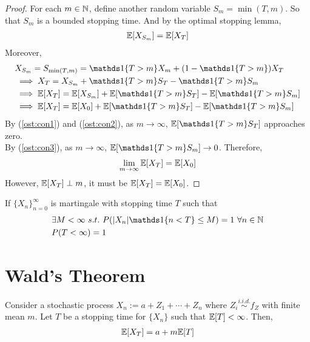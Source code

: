 \documentclass{article}
\begin{document}
	\begin{proof}
		For each $m \in \mathbb{N}$, define another random variable $S_m = \min(T, m)$. So that $S_m$ is a bounded stopping time. And by the optimal stopping lemma,
		\begin{align}
			\mathbb{E}[{X_{S_m}}] = \mathbb{E}[{X_T}]
		\end{align}
		Moreover,
		\begin{align}
			&X_{S_m} = S_{\min(T,m)} = \id{T > m} X_m + (1 - \id{T > m}) X_T \\
			&\implies X_T = X_{S_m} + \id{T > m} S_T - \id{T > m} S_m \\
			&\implies \expect{X_T} = \expect{X_{S_m}} + \expect{\id{T > m} S_T} - \expect{\id{T > m} S_m} \\
			&\implies \expect{X_T} = \expect{X_0} + \expect{\id{T > m} S_T} - \expect{\id{T > m} S_m}
		\end{align}
		By (\ref{ost:con1}) and (\ref{ost:con2}), as $m \to \infty$, $\expect{\id{T > m} S_T}$ approaches zero. \\
		By (\ref{ost:con3}), as $m \to \infty$, $\expect{\id{T > m} S_m} \to 0$. Therefore,
		\begin{align}
			\lim_{m \to \infty} \mathbb{E}[{X_T}] = \mathbb{E}[{X_0}]
		\end{align}
		However, $\mathbb{E}[{X_T}] \perp m$, it must be $\mathbb{E}[{X_T}] = \mathbb{E}[{X_0}]$.
	\end{proof}
	
	\begin{corollary}
		If $\{X_n\}_{n=0}^\infty$ is martingale with stopping time $T$ such that
		\begin{align}
			&\exists M < \infty\ s.t.\ P(|X_n|\id{n < T} \leq M) = 1\ \forall n \in \N \\
			&P(T < \infty) = 1
		\end{align}
	\end{corollary}
	
	\section{Wald's Theorem}
	\begin{theorem}
		Consider a stochastic process $X_n := a + Z_1 + \cdots + Z_n$ where $Z_i \overset{i.i.d.}{\sim} f_Z$ with finite mean $m$. Let $T$ be a stopping time for $\{X_n\}$ such that $\mathbb{E}[{T}] < \infty$. Then,
		\begin{align}
			\mathbb{E}[{X_T}] = a + m \mathbb{E}[{T}]
		\end{align}
	\end{theorem}
	
\end{document}
